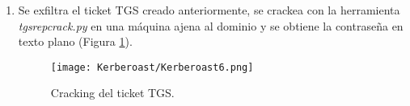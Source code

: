 \begin{enumerate}
\item Se exfiltra el ticket TGS creado anteriormente, se crackea con la herramienta {\it tgsrepcrack.py} en una máquina ajena al dominio y se obtiene la contraseña en texto plano (Figura \ref{Kerberoast6}). 
\begin{figure}[H] %
\begin{center}
\texttt{[image: Kerberoast/Kerberoast6.png]}
\end{center}
\caption{Cracking del ticket TGS.}
\label{Kerberoast6}
\end{figure}

\end{enumerate}
